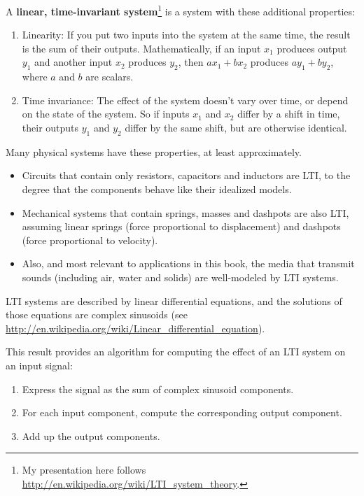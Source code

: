 \documentclass[12pt]{book}
\begin{document}
A {\bf linear, time-invariant system}\footnote{My presentation here
  follows \url{http://en.wikipedia.org/wiki/LTI_system_theory}.} is a
system with these additional properties:

\begin{enumerate}

\item Linearity: If you put two inputs into the system at the same
  time, the result is the sum of their outputs.  Mathematically, if an
  input $x_1$ produces output $y_1$ and another input $x_2$ produces
  $y_2$, then $a x_1 + b x_2$ produces $a y_1 + b y_2$, where $a$ and
  $b$ are scalars.

\item Time invariance: The
  effect of the system doesn't vary over time, or depend on the state
  of the system.  So if inputs $x_1$ and $x_2$ differ by a shift in time,
  their outputs $y_1$ and $y_2$ differ by the same shift, but are otherwise
  identical.

\end{enumerate}

Many physical systems have these properties, at least approximately.

\begin{itemize}

\item Circuits that contain only resistors, capacitors and inductors are
LTI, to the degree that the components behave like their idealized
models.

\item Mechanical systems that contain springs, masses and
dashpots are also LTI, assuming linear springs (force proportional
to displacement) and dashpots (force proportional to velocity).

\item Also, and most relevant to applications in this book,
the media that transmit sounds (including air, water
and solids) are well-modeled by LTI systems.

\end{itemize}

LTI systems are described by linear differential equations, and
the solutions of those equations are complex sinusoids (see
\url{http://en.wikipedia.org/wiki/Linear_differential_equation}).

This result provides an algorithm for computing the effect of
an LTI system on an input signal:

\begin{enumerate}

\item Express the signal as the sum of complex sinusoid components.

\item For each input component, compute the corresponding output component.

\item Add up the output components.

\end{enumerate}
\end{document}
